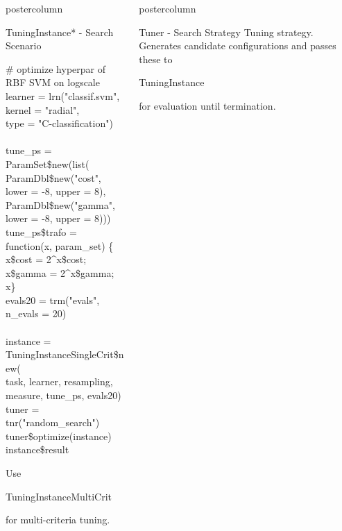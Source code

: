 \documentclass{beamer}
\newlength{\columnheight} %
\newcommand{\codeinline}[1]{\begin{codeboxinline}#1\end{codeboxinline}}
\begin{document}
\begin{frame}[fragile]{}
\begin{columns}
\begin{column}{.245\textwidth}
\begin{beamercolorbox}[center]{postercolumn}
\begin{minipage}{.98\textwidth}
{\begin{myblock}{TuningInstance* - Search Scenario}
							\vspace{1em}
							\begin{codeboxexample}
								{\scriptsize
									\# optimize hyperpar of RBF SVM on logscale\\
									learner = lrn("classif.svm", kernel = "radial",\\
									\hspace*{1ex} type = "C-classification")\\
									\\
									tune\_ps = ParamSet\$new(list(\\
									\hspace*{1ex} ParamDbl\$new("cost", lower = -8, upper = 8),\\
									\hspace*{1ex} ParamDbl\$new("gamma", lower = -8, upper = 8)))\\
									tune\_ps\$trafo = function(x, param\_set) \{\\
									\hspace*{1ex} x\$cost = 2\textasciicircum x\$cost; x\$gamma = 2\textasciicircum x\$gamma; x\}\\
									evals20 = trm("evals", n\_evals = 20)\\
									\\
									instance = TuningInstanceSingleCrit\$new(\\
									\hspace*{1ex} task, learner, resampling, measure, tune\_ps, evals20)\\
									tuner = tnr("random\_search")\\
									tuner\$optimize(instance)\\
									instance\$result}
							\end{codeboxexample}
							Use \codeinline{TuningInstanceMultiCrit} for multi-criteria tuning.
						\end{myblock}
						\vfill}
				\end{minipage}
			\end{beamercolorbox}
		\end{column}
		\begin{column}{.245\textwidth}
			\begin{beamercolorbox}[center]{postercolumn}
				\begin{minipage}{.98\textwidth}
					\parbox[t][\columnheight]{\textwidth}{
						\begin{myblock}{Tuner - Search Strategy}
							Tuning strategy. 
							Generates candidate configurations and passes these to \codeinline{TuningInstance} for evaluation until termination.

\end{myblock}}
\end{minipage}
\end{beamercolorbox}
\end{column}
\end{columns}
\end{frame}
\end{document}
